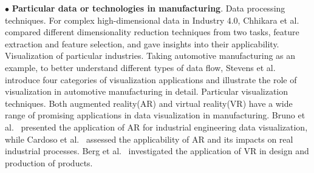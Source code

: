 \documentclass[a4paper,fleqn]{cas-dc}
\begin{document}
$\bullet$ \textbf{Particular data or technologies in manufacturing}.
 Data processing techniques. For complex high-dimensional data in Industry 4.0, Chhikara et al.~\cite{Chhikara2022} compared different dimensionality reduction techniques from two tasks, feature extraction and feature selection, and gave insights into their applicability.
 Visualization of particular industries. Taking automotive manufacturing as an example, to better understand different types of data flow, Stevens et al.~\cite{Schlereth2007} introduce four categories of visualization applications and illustrate the role of visualization in automotive manufacturing in detail.
 Particular visualization techniques. 
Both augmented reality(AR) and virtual reality(VR) have a wide range of promising applications in data visualization in manufacturing.
Bruno et al.~\cite{Bruno2006} presented the application of AR for industrial engineering data visualization, while Cardoso et al.~\cite{DeSouzaCardoso2020} assessed the applicability of AR and its impacts on real industrial processes.
Berg et al.~\cite{Berg2017} investigated the application of VR in design and production of products.
\end{document}
